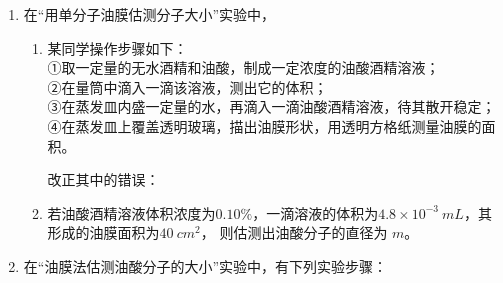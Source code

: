 

\begin{enumerate}
	\item
{}
在“用单分子油膜估测分子大小”实验中，
\begin{enumerate}
	\item
某同学操作步骤如下：\\
①取一定量的无水酒精和油酸，制成一定浓度的油酸酒精溶液；\\
②在量筒中滴入一滴该溶液，测出它的体积；\\
③在蒸发皿内盛一定量的水，再滴入一滴油酸酒精溶液，待其散开稳定；\\
④在蒸发皿上覆盖透明玻璃，描出油膜形状，用透明方格纸测量油膜的面积。

改正其中的错误： \hfullline 


\item 
若油酸酒精溶液体积浓度为$ 0.10 \% $，一滴溶液的体积为$ 4.8 \times 10^{-3} \ mL $，其形成的油膜面积为$ 40 \ cm^{2} $，
则估测出油酸分子的直径为
 \underlinegap 
$ m $。

	
\end{enumerate}



\item 
{}
在“油膜法估测油酸分子的大小”实验中，有下列实验步骤：


\end{enumerate}
